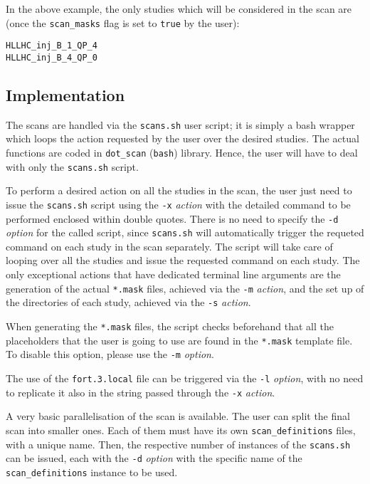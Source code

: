 In the above example, the only studies which will be considered in the
scan are (once the \texttt{scan\_masks} flag is set to \texttt{true}
by the user):
\begin{lstlisting}
HLLHC_inj_B_1_QP_4
HLLHC_inj_B_4_QP_0
\end{lstlisting}

\subsection{Implementation}
The scans are handled via the \texttt{scans.sh} user script;
it is simply a bash wrapper which loops the action requested by the
user over the desired studies. The actual
functions are coded in \texttt{dot\_scan} (\texttt{bash}) library.
Hence, the user will have to deal with only the \texttt{scans.sh}
script.

To perform a desired action on all the studies in the scan, the user
just need to issue the \texttt{scans.sh} script using the \texttt{-x}
\emph{action} with the detailed command to be performed enclosed within
double quotes. There is no
need to specify the \texttt{-d} \emph{option} for the called script, since
\texttt{scans.sh} will automatically trigger the requeted command on each
study in the scan separately. The script
will take care of looping over all the studies and issue the requested
command on each study. The only exceptional actions that have
dedicated terminal line arguments are the generation
of the actual \texttt{*.mask} files, achieved via the \texttt{-m}
\emph{action}, and the set up of the directories of each study,
achieved via the \texttt{-s} \emph{action}.

When generating the \texttt{*.mask} files,
the script checks beforehand that all the placeholders that the
user is going to use are found in the \texttt{*.mask} template
file. To disable this option, please use the \texttt{-m} \emph{option}.

The use of the \texttt{fort.3.local} file can be triggered via
the \texttt{-l} \emph{option}, with no need to replicate it also in
the string passed through the \texttt{-x} \emph{action}.

A very basic parallelisation of the scan is available. The user can
split the final scan into smaller ones. Each of them must have
its own \texttt{scan\_definitions} files, with a unique name. Then,
the respective number of instances of the \texttt{scans.sh} can be issued,
each with the \texttt{-d} \emph{option} with the specific name
of the \texttt{scan\_definitions} instance to be used.

